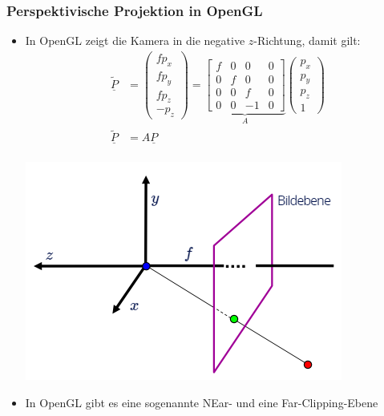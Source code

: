 \documentclass{scrartcl}
\begin{document}
\subsubsection{Perspektivische Projektion in OpenGL}

\begin{itemize}
	\item  In OpenGL zeigt die Kamera in die negative $z$-Richtung, damit gilt: \\
	\begin{equation}
		\begin{split}
			\underline{\widetilde{P}} &= \begin{pmatrix}
			f p_x \\
			f p_y \\
			f p_z \\
			-p_z
			\end{pmatrix} = \underbrace{\begin{bmatrix}
			f & 0 & 0 & 0 \\
			0 & f & 0 & 0 \\
			0 & 0 & f & 0 \\
			0 & 0 & -1 & 0
			\end{bmatrix}}_A \begin{pmatrix}
			p_x \\
			p_y \\
			p_z \\
			1
			\end{pmatrix} \\
			\underline{\widetilde{P}} &= A \underline{P}
		\end{split}
	\end{equation} \\
	\includegraphics[scale=0.5]{figures/projection_negz.png}
	\item In OpenGL gibt es eine sogenannte NEar- und eine Far-Clipping-Ebene

\end{itemize}
\end{document}
